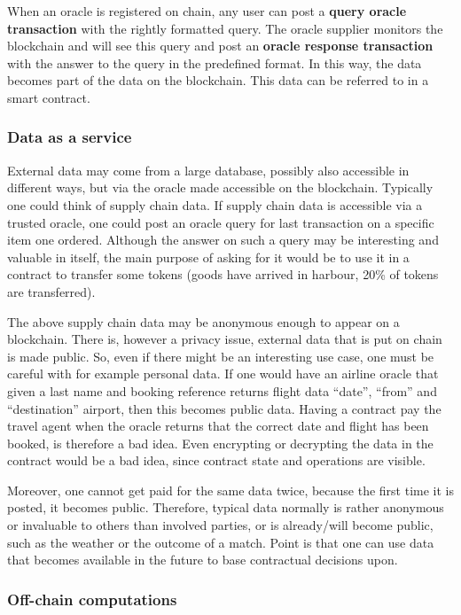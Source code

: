 When an oracle is registered on chain, any user can post a
\textbf{query oracle transaction} with the rightly formatted query.
The oracle supplier monitors the blockchain and will see this
query and post an \textbf{oracle response transaction} with the answer
to the query in the predefined format. In this way,
the data becomes part of the data on the
blockchain. This data can be referred to in a smart contract.

\subsubsection{Data as a service}

External data may come from a large database, possibly also accessible in different
ways, but via the oracle made accessible on the blockchain. Typically
one could think of supply chain data. If supply chain data is
accessible via a trusted oracle, one could post an oracle query for
last transaction on a specific item one ordered. Although the answer
on such a query may be interesting and valuable in itself, the main
purpose of asking for it would be to use it in a contract to transfer
some tokens (goods have arrived in harbour, 20\%  of tokens are
transferred).

The above supply chain data may be anonymous enough to appear on a
blockchain. There is, however a privacy issue, external data that is
put on chain is made public. So, even if there might be an interesting
use case, one must be careful with for example personal data. If one
would have an airline oracle that given a last name and booking
reference returns flight data ``date'', ``from'' and ``destination''
airport, then this becomes public data. Having a contract pay the
travel agent when the oracle returns that the correct date and flight has
been booked, is therefore a bad idea. Even encrypting or decrypting the
data in the contract would be a bad idea, since contract state and
operations are visible.

Moreover, one cannot get paid for the same data twice, because the
first time it is posted, it becomes public. Therefore, typical data
normally is rather anonymous or invaluable to others than involved
parties, or is already/will become public, such as the weather or the
outcome of a match. Point is that one can use data that becomes
available in the future to base contractual decisions upon.

\subsubsection{Off-chain computations}


